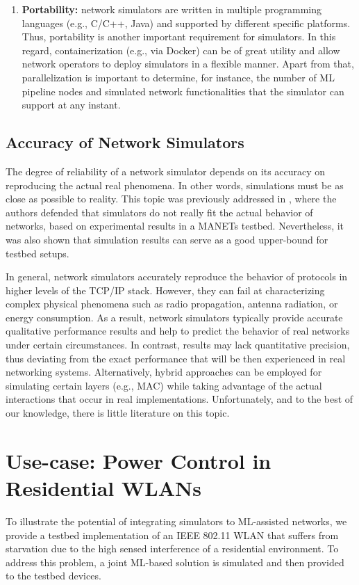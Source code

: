\documentclass{article}
\begin{document}
\begin{enumerate}
        \item \textbf{Portability:} network simulators are written in multiple programming languages (e.g., C/C++, Java) and supported by different specific platforms. Thus, portability is another important requirement for simulators. In this regard, containerization (e.g., via Docker) can be of great utility and allow network operators to deploy simulators in a flexible manner. Apart from that, parallelization is important to determine, for instance, the number of ML pipeline nodes and simulated network functionalities that the simulator can support at any instant.
    \end{enumerate}

	\subsection{Accuracy of Network Simulators}
	The degree of reliability of a network simulator depends on its accuracy on reproducing the actual real phenomena. In other words, simulations must be as close as possible to reality. This topic was previously addressed in \cite{accuracy_manet}, where the authors defended that simulators do not really fit the actual behavior of networks, based on experimental results in a MANETs testbed. Nevertheless, it was also shown that simulation results can serve as a good upper-bound for testbed setups.
		
	In general, network simulators accurately reproduce the behavior of protocols in higher levels of the TCP/IP stack. However, they can fail at characterizing complex physical phenomena such as radio propagation, antenna radiation, or energy consumption. As a result, network simulators typically provide accurate qualitative performance results and help to predict the behavior of real networks under certain circumstances. In contrast, results may lack quantitative precision, thus deviating from the exact performance that will be then experienced in real networking systems. Alternatively, hybrid approaches can be employed for simulating certain layers (e.g., MAC) while taking advantage of the actual interactions that occur in real implementations. Unfortunately, and to the best of our knowledge, there is little literature on this topic. 
		
	\section{Use-case: Power Control in Residential WLANs}	
	To illustrate the potential of integrating simulators to ML-assisted networks, we provide a testbed implementation of an IEEE 802.11 WLAN that suffers from starvation due to the high sensed interference of a residential environment. To address this problem, a joint ML-based solution is simulated and then provided to the testbed devices.
	
\end{document}
